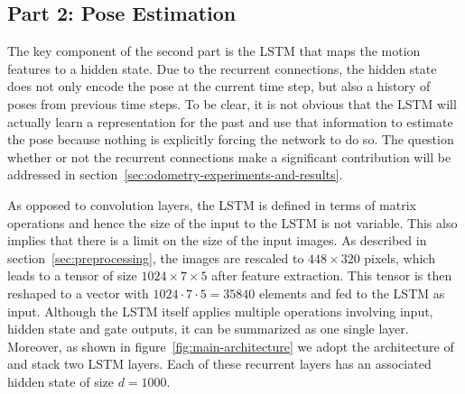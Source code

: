 		\subsection{Part 2: Pose Estimation}
			The key component of the second part is the LSTM that maps the motion features to a hidden state.
			Due to the recurrent connections, the hidden state does not only encode the pose at the current time step, but also a history of poses from previous time steps.
			To be clear, it is not obvious that the LSTM will actually learn a representation for the past and use that information to estimate the pose because nothing is explicitly forcing the network to do so.
			The question whether or not the recurrent connections make a significant contribution will be addressed in section~\ref{sec:odometry-experiments-and-results}.
			
			As opposed to convolution layers, the LSTM is defined in terms of matrix operations and hence the size of the input to the LSTM is not variable.
			This also implies that there is a limit on the size of the input images.
			As described in section~\ref{sec:preprocessing}, the images are rescaled to $448 \times 320$ pixels, which leads to a tensor of size $1024 \times 7 \times 5$ after feature extraction.
			This tensor is then reshaped to a vector with $1024 \cdot 7 \cdot 5 = 35840$ elements and fed to the LSTM as input.
			Although the LSTM itself applies multiple operations involving input, hidden state and gate outputs, it can be summarized as one single layer.
			Moreover, as shown in figure~\ref{fig:main-architecture} we adopt the architecture of~\citeauthor{wang2017deepvo} and stack two LSTM layers.
			Each of these recurrent layers has an associated hidden state of size $d = 1000$.
			
